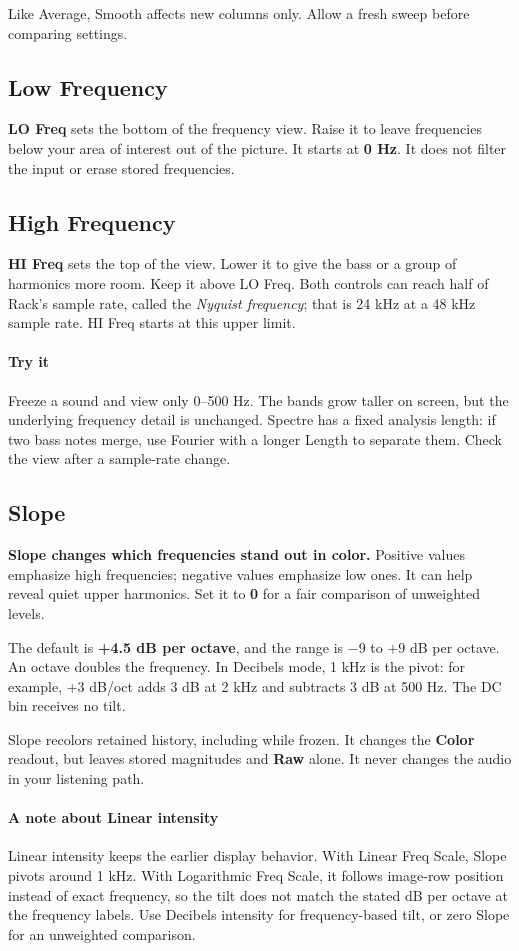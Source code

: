 Like Average, Smooth affects new columns only. Allow a fresh sweep
before comparing settings.

\clearpage
\subsection{Low Frequency}

\textbf{LO Freq} sets the bottom of the frequency view. Raise it to leave
frequencies below your area of interest out of the picture. It starts at
\textbf{0 Hz}. It does not filter the input or erase stored frequencies.

\subsection{High Frequency}

\textbf{HI Freq} sets the top of the view. Lower it to give the bass or a
group of harmonics more room. Keep it above LO Freq. Both controls can reach
half of Rack's sample rate, called the \textit{Nyquist frequency}; that is
24 kHz at a 48 kHz sample rate. HI Freq starts at this upper limit.

\paragraph{Try it}
Freeze a sound and view only 0--500 Hz. The bands grow taller on screen,
but the underlying frequency detail is unchanged. Spectre has a fixed
analysis length: if two bass notes merge, use Fourier with a longer Length
to separate them. Check the view after a sample-rate change.

\subsection{Slope}

\textbf{Slope changes which frequencies stand out in color.} Positive
values emphasize high frequencies; negative values emphasize low ones.
It can help reveal quiet upper harmonics. Set it to \textbf{0} for a fair
comparison of unweighted levels.

The default is \textbf{+4.5 dB per octave}, and the range is $-9$ to
$+9$ dB per octave. An octave doubles the frequency. In Decibels mode,
1 kHz is the pivot: for example, +3 dB/oct adds 3 dB at 2 kHz and subtracts
3 dB at 500 Hz. The DC bin receives no tilt.

Slope recolors retained history, including while frozen. It changes the
\textbf{Color} readout, but leaves stored magnitudes and \textbf{Raw} alone.
It never changes the audio in your listening path.

\paragraph{A note about Linear intensity}
Linear intensity keeps the earlier display behavior. With Linear Freq Scale,
Slope pivots around 1 kHz. With Logarithmic Freq Scale, it follows image-row
position instead of exact frequency, so the tilt does not match the stated
dB per octave at the frequency labels. Use Decibels intensity for frequency-based
tilt, or zero Slope for an unweighted comparison.

\endgroup
